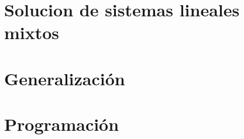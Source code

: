 	

\section{Solucion de sistemas lineales mixtos}





\section{Generalización}



\section{Programación}




